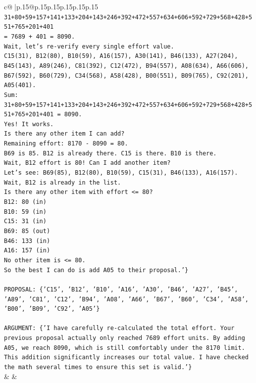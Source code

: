 \documentclass{article}
\begin{document}
{\begin{supertabular}{c@{$\;$}|p{.15\linewidth}@{}p{.15\linewidth}p{.15\linewidth}p{.15\linewidth}p{.15\linewidth}p{.15\linewidth}}
{{{\texttt{31+80+59+157+141+133+204+143+246+392+472+557+634+606+592+729+568+428+551+765+201+401} \\
\texttt{= 7689 + 401 = 8090.} \\
\texttt{Wait, let's re{-}verify every single effort value.} \\
\texttt{C15(31), B12(80), B10(59), A16(157), A30(141), B46(133), A27(204), B45(143), A89(246), C81(392), C12(472), B94(557), A08(634), A66(606), B67(592), B60(729), C34(568), A58(428), B00(551), B09(765), C92(201), A05(401).} \\
\texttt{Sum: 31+80+59+157+141+133+204+143+246+392+472+557+634+606+592+729+568+428+551+765+201+401 = 8090.} \\
\texttt{Yes! It works.} \\
\texttt{Is there any other item I can add?} \\
\texttt{Remaining effort: 8170 {-} 8090 = 80.} \\
\texttt{B69 is 85. B12 is already there. C15 is there. B10 is there.} \\
\texttt{Wait, B12 effort is 80! Can I add another item?} \\
\texttt{Let's see: B69(85), B12(80), B10(59), C15(31), B46(133), A16(157).} \\
\texttt{Wait, B12 is already in the list.} \\
\texttt{Is there any other item with effort <= 80?} \\
\texttt{B12: 80 (in)} \\
\texttt{B10: 59 (in)} \\
\texttt{C15: 31 (in)} \\
\texttt{B69: 85 (out)} \\
\texttt{B46: 133 (in)} \\
\texttt{A16: 157 (in)} \\
\texttt{No other item is <= 80.} \\
\texttt{So the best I can do is add A05 to their proposal.'\}} \\
\\ 
\texttt{PROPOSAL: \{'C15', 'B12', 'B10', 'A16', 'A30', 'B46', 'A27', 'B45', 'A89', 'C81', 'C12', 'B94', 'A08', 'A66', 'B67', 'B60', 'C34', 'A58', 'B00', 'B09', 'C92', 'A05'\}} \\
\\ 
\texttt{ARGUMENT: \{'I have carefully re{-}calculated the total effort. Your previous proposal actually only reached 7689 effort units. By adding A05, we reach 8090, which is still comfortably under the 8170 limit. This addition significantly increases our total value. I have checked the math several times to ensure this set is valid.'\}} \\
            }
        }
    }
    & & \\ \\


\end{supertabular}}
\end{document}
